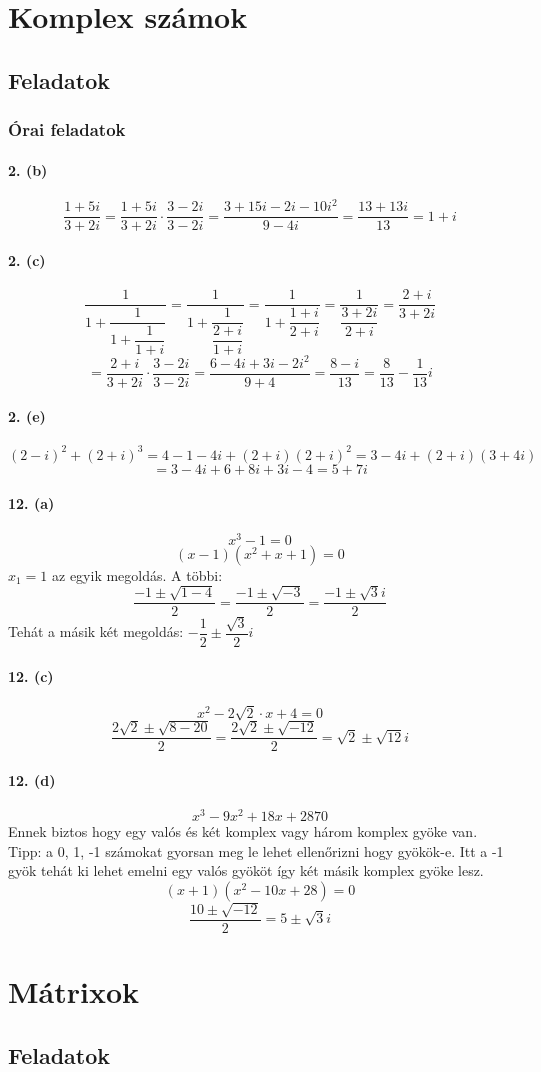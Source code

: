 \documentclass[12pt,a4paper,fleqn]{article}
\newcommand{\myparagraph}[1]{\paragraph{#1}\mbox{}}
\begin{document}
\clearpage
\section{Komplex számok}
\setcounter{subsection}{1}
\subsection{Feladatok}
\subsubsection{Órai feladatok}

\myparagraph{2. (b)}
\[ \dfrac{1+5i}{3+2i} = \dfrac{1+5i}{3+2i} \cdot \dfrac{3-2i}{3-2i} =
  \dfrac{3+15i-2i-10i^2}{9-4i} = \dfrac{13+13i}{13} = 1+i
\]

\myparagraph{2. (c)}
\[ \dfrac{1}{1+\dfrac{1}{1+\dfrac{1}{1+i}}} = \dfrac{1}{1+\dfrac{1}{\dfrac{2+i}{1+i}}}
  = \dfrac{1}{1+\dfrac{1+i}{2+i}} = \dfrac{1}{\dfrac{3+2i}{2+i}} = \dfrac{2+i}{3+2i}
\]
\[ = \dfrac{2+i}{3+2i} \cdot \dfrac{3-2i}{3-2i} = \dfrac{6-4i+3i-2i^2}{9+4}
  = \dfrac{8-i}{13} = \dfrac{8}{13} - \dfrac{1}{13}i
\]

\myparagraph{2. (e)}
\[ (2-i)^2+(2+i)^3 = 4-1-4i+(2+i)(2+i)^2 = 3 - 4i + (2+i)(3+4i) \]
\[ = 3 - 4i + 6 +8i +3i -4 = 5+7i \]

\myparagraph{12. (a)}
\[ x^3-1 = 0 \]
\[ (x-1)(x^2+x+1) = 0 \]
$x_1 = 1$ az egyik megoldás. A többi:
\[ \dfrac{-1\pm \sqrt{1-4}}{2} = \dfrac{-1\pm \sqrt{-3}}{2} = \dfrac{-1\pm
  \sqrt{3}i}{2} \]
Tehát a másik két megoldás: $-\dfrac{1}{2} \pm \dfrac{\sqrt{3}}{2}i$

\myparagraph{12. (c)}
\[ x^2-2\sqrt{2} \cdot x + 4 = 0 \]
\[ \dfrac{2\sqrt{2} \pm \sqrt{8-20}}{2} = \dfrac{2\sqrt{2} \pm \sqrt{-12}}{2}
  = \sqrt{2} \pm \sqrt{12}i
\]

\myparagraph{12. (d)}
\[ x^3-9x^2+18x+28 7 0 \]
Ennek biztos hogy egy valós és két komplex vagy három komplex gyöke van.\\
Tipp: a 0, 1, -1 számokat gyorsan meg le lehet ellenőrizni hogy gyökök-e. Itt a
-1 gyök tehát ki lehet emelni egy valós gyököt így két másik komplex gyöke lesz.
\[ (x+1)(x^2-10x+28) = 0 \]
\[ \dfrac{10 \pm \sqrt{-12}}{2} = 5 \pm \sqrt{3}i \]


\clearpage
\section{Mátrixok}
\setcounter{subsection}{1}
\subsection{Feladatok}
\end{document}
